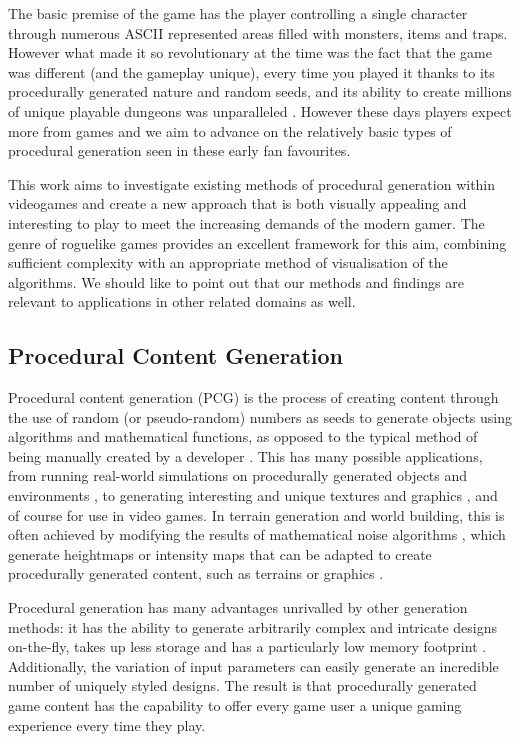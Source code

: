 \documentclass[12pt,a4paper]{article}
\begin{document}
The basic premise of the game has the player controlling a single character through numerous ASCII represented areas filled with monsters, items and traps. However what made it so revolutionary at the time was the fact that the game was different (and the gameplay unique), every time you played it thanks to its procedurally generated nature and random seeds, and its ability to create millions of unique playable dungeons was unparalleled \cite{platformgames}. However these days players expect more from games and we aim to advance on the relatively basic types of procedural generation seen in these early fan favourites. 


This work aims to investigate existing methods of procedural generation within videogames and create a new approach that is both visually appealing and interesting to play to meet the increasing demands of the modern gamer. The genre of roguelike games provides an excellent framework for this aim, combining sufficient complexity with an appropriate method of visualisation of the algorithms. We should like to point out that our methods and findings are relevant to applications in other related domains as well.  




\subsection{Procedural Content Generation}

Procedural content generation (PCG) is the process of creating content through the use of random (or pseudo-random) numbers as seeds to generate objects using algorithms and mathematical functions, as opposed to the typical method of being manually created by a developer \cite{pgcbook}. This has many possible applications, from running real-world simulations on procedurally generated objects and environments \cite{VAST}, to generating interesting and unique textures and graphics \cite{imagesynth}, and of course for use in video games. In terrain generation and world building, this is often achieved by modifying the results of mathematical noise algorithms \cite{pgcbookch4}, which generate heightmaps or intensity maps that can be adapted to create procedurally generated content, such as terrains or graphics \cite{improvepnoise}.  


Procedural generation has many advantages unrivalled by other generation methods: it has the ability to generate arbitrarily complex and intricate designs on-the-fly, takes up less storage and has a particularly low memory footprint \cite{surveyPNF}. Additionally, the variation of input parameters can easily generate an incredible number of uniquely styled designs. The result is that procedurally generated game content has the capability to offer every game user a unique gaming experience every time they play. 
\end{document}
